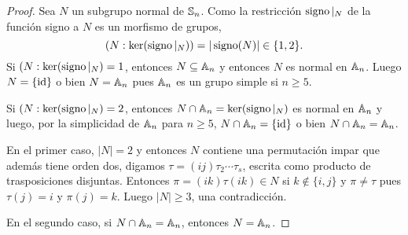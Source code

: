 \begin{proof}
Sea $N$ un subgrupo normal de $\mathbb{S}_n$. Como la restricción $\operatorname{signo}|_N$ de la función signo a $N$ es un morfismo de grupos, 
\[
(N:\ker(\operatorname{signo}|_N))=|\operatorname{signo}(N)|\in\{1,2\}.
\] 
Si $(N:\ker(\operatorname{signo}|_N)=1$, entonces $N\subseteq\mathbb{A}_n$ y entonces $N$ es normal en $\mathbb{A}_n$. 
Luego $N=\{\operatorname{id}\}$ o bien $N=\mathbb{A}_n$ pues $\mathbb{A}_n$ es un grupo simple si $n\geq5$. 

Si $(N:\ker(\operatorname{signo}|_N)=2$, entonces $N\cap\mathbb{A}_n=\ker(\operatorname{signo}|_N)$ es normal en $\mathbb{A}_n$ y luego, por la simplicidad de $\mathbb{A}_n$ para $n\geq5$, $N\cap\mathbb{A}_n=\{\operatorname{id}\}$ o bien $N\cap\mathbb{A}_n=\mathbb{A}_n$. 

En el primer caso, $|N|=2$ y entonces $N$ contiene una permutación impar que además tiene orden dos, digamos
$\tau=(ij)\tau_2\cdots\tau_s$, escrita como producto de trasposiciones disjuntas. Entonces
$\pi=(ik)\tau(ik)\in N$ si $k\not\in\{i,j\}$ y $\pi\ne \tau$ pues $\tau(j)=i$ y $\pi(j)=k$. Luego $|N|\geq3$, una contradicción. 

En el segundo caso, si $N\cap\mathbb{A}_n=\mathbb{A}_n$, entonces $N=\mathbb{A}_n$.
\end{proof}
